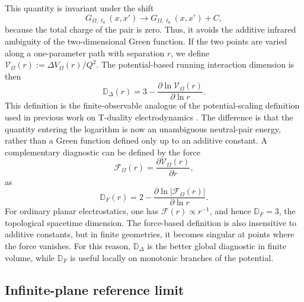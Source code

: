 \documentclass[openacc]{rsproca_new}%
\begin{document}
This quantity is invariant under the shift
\begin{equation}
  G_{\Omega,\ell_0}(x,x')\longrightarrow G_{\Omega,\ell_0}(x,x')+C,
\end{equation}
because the total charge of the pair is zero. Thus, it avoids the additive infrared ambiguity of the two-dimensional Green function. If the two points are varied along a one-parameter path with separation $r$, we define $\mathcal{V}_\Omega(r):=\Delta V_\Omega(r)/Q^2$. The potential-based running interaction dimension is then
\begin{equation}
  \mathbb D_\Delta(r)=3-\frac{\partial\ln \mathcal V_\Omega(r)}{\partial\ln r}.
\end{equation}
This definition is the finite-observable analogue of the potential-scaling definition used in previous work on T-duality electrodynamics \cite{GaeteNicolini2022, GaeteNicolini2026}. The difference is that the quantity entering the logarithm is now an unambiguous neutral-pair energy, rather than a Green function defined only up to an additive constant. A complementary diagnostic can be defined by the force
\begin{equation}
  \mathcal F_\Omega(r)=\frac{\partial\mathcal V_\Omega(r)}{\partial r},
\end{equation}
as
\begin{equation}
\mathbb D_F(r)=2-\frac{\partial\ln|\mathcal F_\Omega(r)|}{\partial\ln r}.
\end{equation}
For ordinary planar electrostatics, one has $\mathcal F(r)\propto r^{-1}$, and hence $\mathbb D_F=3$, the topological spacetime dimension. The force-based definition is also insensitive to additive constants, but in finite geometries, it becomes singular at points where the force vanishes. For this reason, $\mathbb D_\Delta$ is the better global diagnostic in finite volume, while $\mathbb D_F$ is useful locally on monotonic branches of the potential.

\subsection{Infinite-plane reference limit}
\label{subsec:running_dimension_infinite}
\end{document}
